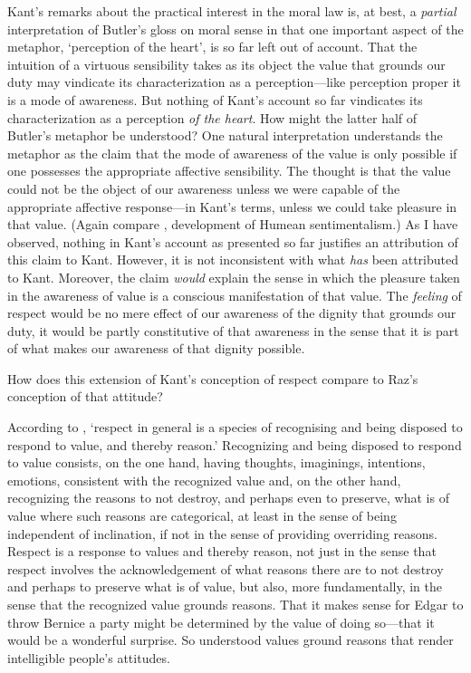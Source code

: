 \documentclass[12pt]{article}
\begin{document}
Kant's remarks about the practical interest in the moral law is, at best, a \emph{partial} interpretation of Butler's gloss on moral sense in that one important aspect of the metaphor, `perception of the heart', is so far left out of account. That the intuition of a virtuous sensibility takes as its object the value that grounds our duty may vindicate its characterization as a perception---like perception proper it is a mode of awareness. But nothing of Kant's account so far vindicates its characterization as a perception \emph{of the heart}. How might the latter half of Butler's metaphor be understood? One natural interpretation understands the metaphor as the claim that the mode of awareness of the value is only possible if one possesses the appropriate affective sensibility. The thought is that the value could not be the object of our awareness unless we were capable of the appropriate affective response---in Kant's terms, unless we could take pleasure in that value. (Again compare \citealp{Wiggins:1987ta}, development of Humean sentimentalism.) As I have observed, nothing in Kant's account as presented so far justifies an attribution of this claim to Kant. However, it is not inconsistent with what \emph{has} been attributed to Kant. Moreover, the claim \emph{would} explain the sense in which the pleasure taken in the awareness of value is a conscious manifestation of that value. The \emph{feeling} of respect would be no mere effect of our awareness of the dignity that grounds our duty, it would be partly constitutive of that awareness in the sense that it is part of what makes our awareness of that dignity possible. 

How does this extension of Kant's conception of respect compare to Raz's conception of that attitude?

According to \citet[160]{Raz:2001ps}, `respect in general is a species of recognising and being disposed to respond to value, and thereby reason.' Recognizing and being disposed to respond to value consists, on the one hand, having thoughts, imaginings, intentions, emotions, consistent with the recognized value and, on the other hand, recognizing the reasons to not destroy, and perhaps even to preserve, what is of value where such reasons are categorical, at least in the sense of being independent of inclination, if not in the sense of providing overriding reasons. Respect is a response to values and thereby reason, not just in the sense that respect involves the acknowledgement of what reasons there are to not destroy and perhaps to preserve what is of value, but also, more fundamentally, in the sense that the recognized value grounds reasons. That it makes sense for Edgar to throw Bernice a party might be determined by the value of doing so---that it would be a wonderful surprise. So understood values ground reasons that render intelligible people's attitudes. 
\end{document}
